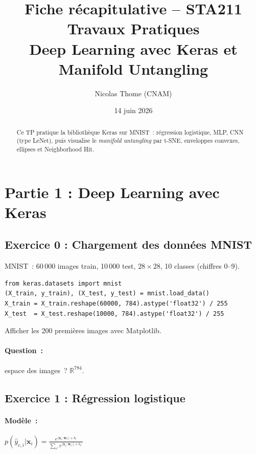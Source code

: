 \documentclass[a4paper,11pt]{article}
\title{\textbf{Fiche r\'ecapitulative -- STA211}\\[4pt]
\large Travaux Pratiques \\[2pt]
\small Deep Learning avec Keras et Manifold Untangling}
\author{Nicolas Thome (CNAM)}
\date{14 juin 2026}
\theoremstyle{definition}
\theoremstyle{remark}
\begin{document}
\maketitle
\thispagestyle{empty}

\begin{abstract}
Ce TP pratique la biblioth\`eque Keras sur MNIST~: r\'egression
logistique, MLP, CNN (type LeNet), puis visualise le \emph{manifold
untangling} par t-SNE, enveloppes convexes, ellipses et
Neighborhood Hit.
\end{abstract}

\vfill
\tableofcontents
\newpage

\section{Partie 1 : Deep Learning avec Keras}

\subsection{Exercice 0 : Chargement des donn\'ees MNIST}

MNIST~: 60\,000 images train, 10\,000 test, $28\times28$,
10 classes (chiffres 0--9).

\begin{lstlisting}
from keras.datasets import mnist
(X_train, y_train), (X_test, y_test) = mnist.load_data()
X_train = X_train.reshape(60000, 784).astype('float32') / 255
X_test  = X_test.reshape(10000, 784).astype('float32') / 255
\end{lstlisting}

Afficher les 200 premi\`eres images avec Matplotlib.

\paragraph{Question~:} espace des images~? $\mathbb{R}^{784}$.

\subsection{Exercice 1 : R\'egression logistique}

\paragraph{Mod\`ele~:} $p(\hat{y}_{c,i}|\mathbf{x}_i) =
\frac{e^{\langle\mathbf{x}_i;\mathbf{w}_c\rangle + b_c}}
{\sum_{c'} e^{\langle\mathbf{x}_i;\mathbf{w}_{c'}\rangle + b_{c'}}}$
\end{document}

